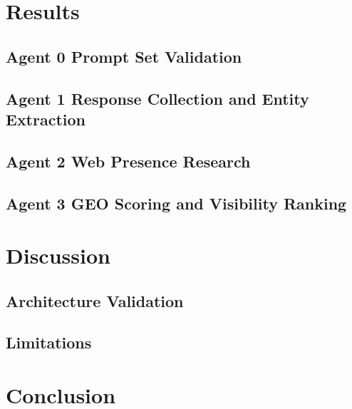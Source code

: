 \section{Results}
\label{sec:results}



\subsection{Agent 0 Prompt Set Validation}


\subsection{Agent 1 Response Collection and Entity Extraction}


\subsection{Agent 2 Web Presence Research}



\subsection{Agent 3  GEO Scoring and Visibility Ranking}



\section{Discussion}
\label{sec:discussion}

\subsection{Architecture Validation}


\subsection{Limitations}


\section{Conclusion}
